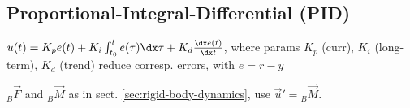 \subsection{Proportional-Integral-Differential (PID)}
$u(t) = K_p e(t) + K_i \int_{t_0}^{t} e(\tau) \dx \tau + K_d \frac{\dx e(t)}{\dx t}$, where params $K_p$ (curr), $K_i$ (long-term), $K_d$ (trend) reduce corresp. errors,
with $e = r - y$

 ${_B}\vec{F}$ and ${_B}\vec{M}$ as in sect. \ref{sec:rigid-body-dynamics}, use $\vec{u}' = {_B}\vec{M}$.
